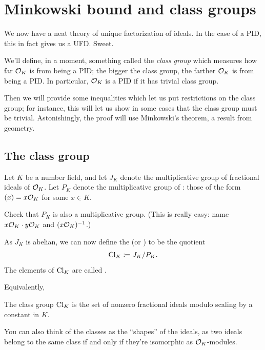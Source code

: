 \chapter{Minkowski bound and class groups}
\label{ch:class_groups}
We now have a neat theory of unique factorization of ideals.
In the case of a PID, this in fact gives us a UFD. Sweet.

We'll define, in a moment, something called the \emph{class group}
which measures how far $\mathcal O_K$ is from being a PID;
the bigger the class group, the farther $\mathcal O_K$ is from being a PID.
In particular, $\mathcal O_K$ is a PID if it has trivial class group.

Then we will provide some inequalities which let us put restrictions on the class group;
for instance, this will let us show in some cases that the class group must be trivial.
Astonishingly, the proof will use Minkowski's theorem, a result from geometry.

\section{The class group}
Let $K$ be a number field,
and let $J_K$ denote the multiplicative group of fractional ideals of $\mathcal O_K$.
Let $P_K$ denote the multiplicative group of :
those of the form $(x) = x \mathcal O_K$ for some $x \in K$.
\begin{ques}
Check that $P_K$ is also a multiplicative group.
(This is really easy: name $x\mathcal O_K \cdot y\mathcal O_K$ and $(x\mathcal O_K)^{-1}$.)
\end{ques}
As $J_K$ is abelian, we can now define the  (or ) to be the quotient
\[ \mathrm{Cl}_K \coloneqq J_K / P_K. \]
The elements of $\mathrm{Cl}_K$ are called .

Equivalently,
\begin{moral}
The class group $\mathrm{Cl}_K$ is the set of nonzero fractional ideals modulo
scaling by a constant in $K$.
\end{moral}

You can also think of the classes as the ``shapes'' of the ideals,
as two ideals belong to the same class if and only if
they're isomorphic as $\mathcal O_K$-modules.

